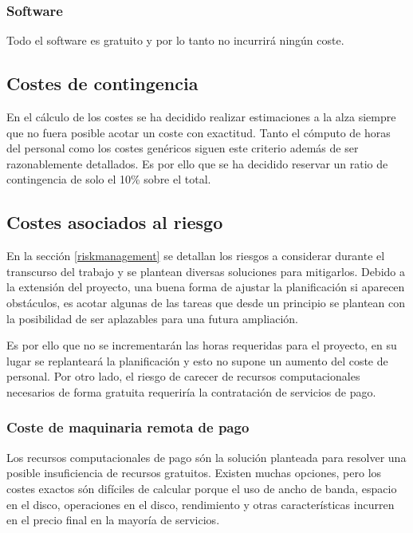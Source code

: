 \subsubsection{Software} Todo el software es gratuito y por lo tanto no incurrirá ningún coste.

\subsection{Costes de contingencia}
En el cálculo de los costes se ha decidido realizar estimaciones a la alza siempre que no fuera posible acotar
un coste con exactitud. Tanto el cómputo de horas del personal como los costes genéricos siguen este
criterio además de ser razonablemente detallados.
Es por ello que se ha decidido reservar un ratio de contingencia de solo el 10\% sobre el total.

\subsection{Costes asociados al riesgo}
En la sección \ref{riskmanagement} se detallan los riesgos a considerar durante el transcurso del trabajo y se plantean
diversas soluciones para mitigarlos. Debido a la extensión del proyecto, una buena forma de ajustar la planificación
si aparecen obstáculos, es acotar algunas de las tareas que desde un principio se plantean con la posibilidad de 
ser aplazables para una futura ampliación.

Es por ello que no se incrementarán las horas requeridas para el proyecto, en su lugar se
replanteará la planificación y esto no supone un aumento del coste de personal.
Por otro lado, el riesgo de carecer de recursos computacionales necesarios de forma gratuita requeriría la contratación de servicios de pago.

\subsubsection{Coste de maquinaria remota de pago}\label{maquinariardepago}
Los recursos computacionales de pago són la solución planteada para resolver una posible insuficiencia de recursos
gratuitos.
Existen muchas opciones, pero los costes exactos són difíciles de calcular porque el uso de ancho de banda,
espacio en el disco, operaciones en el disco, rendimiento y otras características incurren en el precio final en la mayoría
de servicios.

